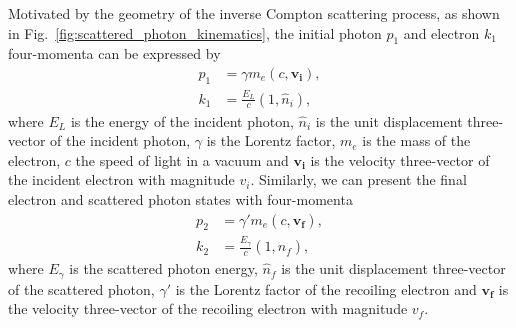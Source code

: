 \documentclass[../main.tex]{subfiles}
\begin{document}
Motivated by the geometry of the inverse Compton scattering process, as shown in Fig.~\ref{fig:scattered_photon_kinematics}, the initial photon $p_{1}$ and electron $k_{1}$ four-momenta can be expressed by
\begin{align}
p_{1} &= \gamma m_{e}\left(c,\boldsymbol{v_{i}}\right),
\label{eq:initial_four_vectors} \\
k_{1} &= \frac{E_{L}}{c}\left(1,\hat{n}_{i}\right), 
\end{align}
where $E_{L}$ is the energy of the incident photon, $\hat{n}_{i}$ is the unit displacement three-vector of the incident photon, $\gamma$ is the Lorentz factor, $m_{e}$ is the mass of the electron, $c$ the speed of light in a vacuum and $\boldsymbol{v_{i}}$ is the velocity three-vector of the incident electron with magnitude $v_{i}$. Similarly, we can present the final electron and scattered photon states with four-momenta
\begin{align}
p_{2} &= \gamma' m_{e}\left(c,\boldsymbol{v_{f}}\right), \\
k_{2} &= \frac{E_{\gamma}}{c}\left(1,\hat{n}_{f}\right), 
\label{eq:final_four_vectors} 
\end{align}
where $E_{\gamma}$ is the scattered photon energy, $\hat{n}_{f}$ is the unit displacement three-vector of the scattered photon, $\gamma'$ is the Lorentz factor of the recoiling electron and $\boldsymbol{v_{f}}$ is the velocity three-vector of the recoiling electron with magnitude $v_{f}$.
\end{document}
